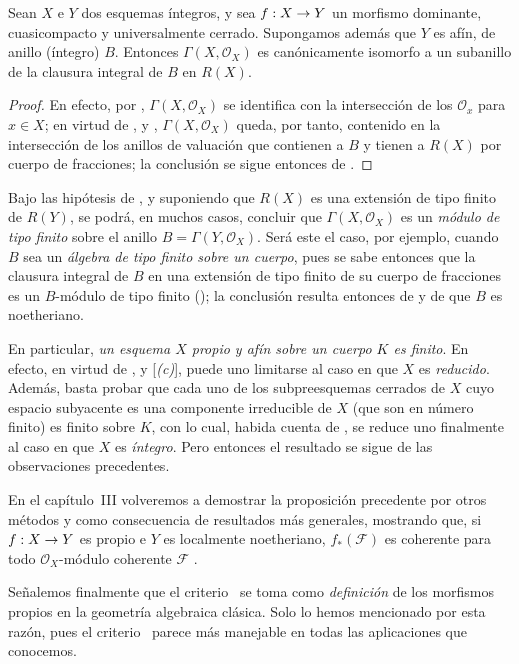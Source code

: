 \documentclass[oneside,10pt]{amsart}
\makeatletter
\newcommand{\ega@arrow}[2]{\mathchoice{#1}{#2}{#2}{#2}}
\renewcommand{\to}{\ega@arrow{\longrightarrow}{\rightarrow}}
\let\EGAOriginalLabel\label
\renewcommand{\label}[1]{\phantomsection\EGAOriginalLabel{#1}}
\makeatother
\begin{document}
\begin{corollary}[7.3.11]
\label{II.7.3.11-fr}
Sean $X$ e $Y$ dos esquemas íntegros, y sea $f:X\to Y$ un morfismo dominante, cuasicompacto y universalmente cerrado.
Supongamos además que $Y$ es afín, de anillo (íntegro) $B$.
Entonces $\Gamma(X,\mathcal{O}_X)$ es canónicamente isomorfo a un subanillo de la clausura integral de $B$ en $R(X)$.
\end{corollary}

\begin{proof}
En efecto, por , $\Gamma(X,\mathcal{O}_X)$ se identifica con la intersección de los $\mathcal{O}_x$ para $x\in X$;
en virtud de ,  y , $\Gamma(X,\mathcal{O}_X)$ queda, por tanto, contenido en la intersección de los anillos de valuación que contienen a $B$ y tienen a $R(X)$ por cuerpo de fracciones;
la conclusión se sigue entonces de .
\end{proof}

\begin{remarks}[7.3.12]
\label{II.7.3.12-fr}
Bajo las hipótesis de , y suponiendo que $R(X)$ es una extensión de tipo finito de $R(Y)$, se podrá, en muchos casos, concluir que $\Gamma(X,\mathcal{O}_X)$ es un \emph{módulo de tipo finito} sobre el anillo $B=\Gamma(Y,\mathcal{O}_X)$.
Será este el caso, por ejemplo, cuando $B$ sea un \emph{álgebra de tipo finito sobre un cuerpo}, pues se sabe entonces que la clausura integral de $B$ en una extensión de tipo finito de su cuerpo de fracciones es un $B$-módulo de tipo finito (\cite[t.~I, p.~267, th.~9]{I-13});
la conclusión resulta entonces de  y de que $B$ es noetheriano.

En particular, \emph{un esquema $X$ propio y afín sobre un cuerpo $K$ es finito}.
En efecto, en virtud de ,  y [\emph{(c)}], puede uno limitarse al caso en que $X$ es \emph{reducido}.
Además, basta probar que cada uno de los subpreesquemas cerrados de $X$ cuyo espacio subyacente es una componente irreducible de $X$ (que son en número finito) es finito sobre $K$, con lo cual, habida cuenta de , se reduce uno finalmente al caso en que $X$ es \emph{íntegro}.
Pero entonces el resultado se sigue de las observaciones precedentes.

En el capítulo~III volveremos a demostrar la proposición precedente por otros métodos y como consecuencia de resultados más generales, mostrando que, si $f:X\to Y$ es propio e $Y$ es localmente noetheriano, $f_*(\mathcal{F})$ es coherente para todo $\mathcal{O}_X$-módulo coherente $\mathcal{F}$ .

Señalemos finalmente que el criterio~ se toma como \emph{definición} de los morfismos propios en la geometría algebraica clásica.
Solo lo hemos mencionado por esta razón, pues el criterio~ parece más manejable en todas las aplicaciones que conocemos.
\end{remarks}
\end{document}
